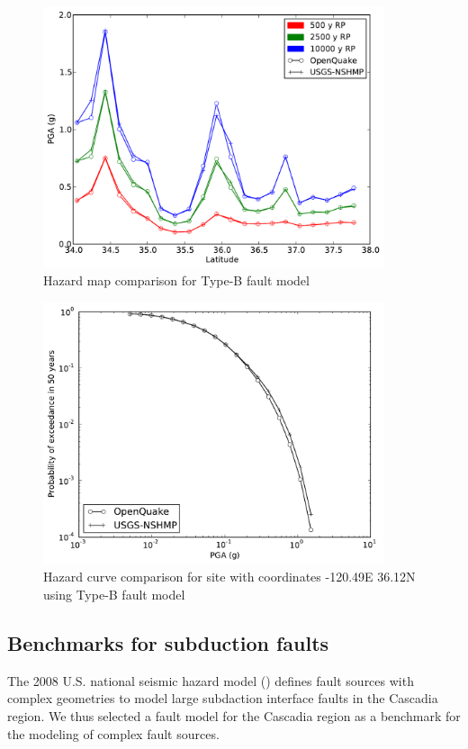 \begin{figure}
\centering
\includegraphics[width=10cm]{./qareport/pictures/oq_nshmp_bFault_ar1.pdf}
\caption{Hazard map comparison for Type-B fault model}
\label{fig:type_b_map}
\end{figure}
\begin{figure}
\centering
\includegraphics[width=10cm]{./qareport/pictures/-120pt49_36pt12_bFault_ar1.pdf}
\caption{Hazard curve comparison for site with coordinates -120.49E 36.12N using Type-B fault model}
\label{fig:type_b_curve}
\end{figure}

\subsection{Benchmarks for subduction faults}
The 2008 U.S. national seismic hazard model (\cite{petersen2008}) defines fault sources with complex geometries to model large subdaction interface faults in the Cascadia region. We thus selected a fault model for the Cascadia region as a benchmark for the modeling of complex fault sources.

